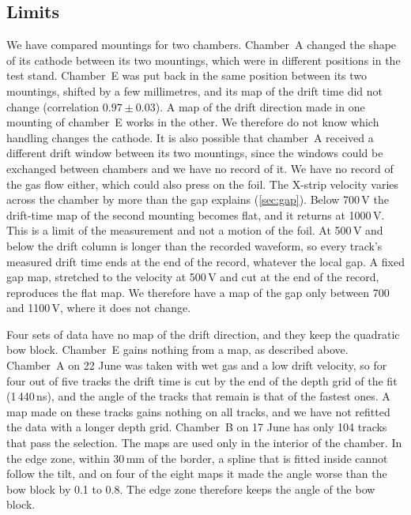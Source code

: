 \subsection{Limits}
We have compared mountings for two chambers. Chamber~A changed the shape of its cathode between its two
mountings, which were in different positions in the test stand. Chamber~E was put back in the same position between
its two mountings, shifted by a few millimetres, and its map of the drift time did not change (correlation
$0.97\pm0.03$). A map of the drift direction made in one mounting of chamber~E works in the other. We therefore do
not know which handling changes the cathode. It is also possible that chamber~A received a different drift window
between its two mountings, since the windows could be exchanged between chambers and we have no record of it. We have
no record of the gas flow either, which could also press on the foil. The X-strip velocity varies across the chamber by
more than the gap explains (\cref{sec:gap}). Below 700\,V the drift-time map of the second mounting becomes flat, and it
returns at 1000\,V. This is a limit of the measurement and not a motion of the foil. At 500\,V and below the drift
column is longer than the recorded waveform, so every track's measured drift time ends at the end of the record,
whatever the local gap. A fixed gap map, stretched to the velocity at 500\,V and cut at the end of the record,
reproduces the flat map. We therefore have a map of the gap only between 700 and 1100\,V, where it does not change.

Four sets of data have no map of the drift direction, and they keep the quadratic bow block. Chamber~E gains nothing
from a map, as described above. Chamber~A on 22 June was taken with wet gas and a low drift velocity, so for four out of
five tracks the drift time is cut by the end of the depth grid of the fit (1\,440\,ns), and the angle of the tracks that
remain is that of the fastest ones. A map made on these tracks gains nothing on all tracks, and we have not refitted
the data with a longer depth grid. Chamber~B on 17 June has only 104 tracks that pass the selection. The
maps are used only in the interior of the chamber. In the edge zone, within 30\,mm of the border, a spline that is fitted
inside cannot follow the tilt, and on four of the eight maps it made the angle worse than the bow block by 0.1 to
0.8\textdegree. The edge zone therefore keeps the angle of the bow block.
